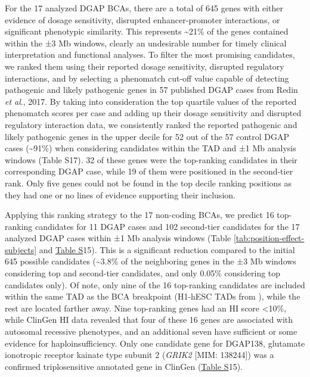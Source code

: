 \documentclass[a4paper,twoside=true,openright,parskip=full,chapterprefix=true,11pt,headings=normal,bibliography=totoc,listof=totoc,titlepage=on,captions=tableabove,draft=false]{scrreprt}
\theoremstyle{definition}
\theoremstyle{definition}
\theoremstyle{definition}
\theoremstyle{remark}
\begin{document}
For the 17 analyzed DGAP BCAs, there are a total of 645 genes with
either evidence of dosage sensitivity, disrupted enhancer-promoter
interactions, or significant phenotypic similarity. This represents
\textasciitilde{}21\% of the genes contained within the ±3 Mb windows,
clearly an undesirable number for timely clinical interpretation and
functional analyses. To filter the most promising candidates, we ranked
them using their reported dosage sensitivity, disrupted regulatory
interactions, and by selecting a phenomatch cut-off value capable of
detecting pathogenic and likely pathogenic genes in 57 published DGAP
cases from Redin \emph{et al}., 2017.\citep{Redin2017} By taking into
consideration the top quartile values of the reported phenomatch scores
per case and adding up their dosage sensitivity and disrupted regulatory
interaction data, we consistently ranked the reported pathogenic and
likely pathogenic genes in the upper decile for 52 out of the 57 control
DGAP cases (\textasciitilde{}91\%) when considering candidates within
the TAD and ±1 Mb analysis windows (Table S17). 32 of these genes were
the top-ranking candidates in their corresponding DGAP case, while 19 of
them were positioned in the second-tier rank. Only five genes could not
be found in the top decile ranking positions as they had one or no lines
of evidence supporting their inclusion.

Applying this ranking strategy to the 17 non-coding BCAs, we predict 16
top-ranking candidates for 11 DGAP cases and 102 second-tier candidates
for the 17 analyzed DGAP cases within ±1 Mb analysis windows (Table
\ref{tab:position-effect-subjects} and
\protect\hyperlink{position-effect-sub-tab}{Table S}15). This is a
significant reduction compared to the initial 645 possible candidates
(\textasciitilde{}3.8\% of the neighboring genes in the ±3 Mb windows
considering top and second-tier candidates, and only 0.05\% considering
top candidates only). Of note, only nine of the 16 top-ranking
candidates are included within the same TAD as the BCA breakpoint
(H1-hESC TADs from \citep{Dixon2012}), while the rest are located
farther away. Nine top-ranking genes had an HI score
\textless{}10\%,\citep{Huang2010} while ClinGen HI data revealed that
four of these 16 genes are associated with autosomal recessive
phenotypes, and an additional seven have sufficient or some evidence for
haploinsufficiency. Only one candidate gene for DGAP138, glutamate
ionotropic receptor kainate type subunit 2 (\emph{GRIK2} {[}MIM:
138244{]}) was a confirmed triplosensitive annotated gene in ClinGen
(\protect\hyperlink{position-effect-sub-tab}{Table S}15).
\end{document}
